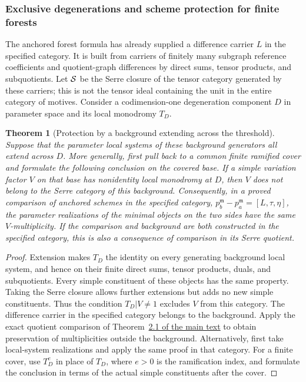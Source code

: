 \documentclass[11pt,a4paper,oneside]{article}
\theoremstyle{plain}
\newtheorem{theorem}{Theorem}[section]
\theoremstyle{definition}
\theoremstyle{remark}
\numberwithin{equation}{section}
\newcommand{\otherref}[2]{\href{#1.pdf}{#2}}
\begin{document}
\subsubsection{Exclusive degenerations and scheme protection for finite forests}
The anchored forest formula has already supplied a difference carrier $L$ in the specified category.
It is built from carriers of finitely many subgraph reference coefficients and quotient-graph differences by direct sums, tensor products, and subquotients.
Let $\mathcal S$ be the Serre closure of the tensor category generated by these carriers;
this is not the tensor ideal containing the unit in the entire category of motives.
Consider a codimension-one degeneration component $D$ in parameter space and its local monodromy $T_D$.

\begin{theorem}[Protection by a background extending across the threshold]\label{unified:thm:forestthreshold}
Suppose that the parameter local systems of these background generators all extend across $D$.
More generally, first pull back to a common finite ramified cover and formulate the following conclusion on the covered base.
If a simple variation factor $V$ on that base has nonidentity local monodromy at $D$,
then $V$ does not belong to the Serre category of this background.
Consequently, in a proved comparison of anchored schemes in the specified category,
$p_b^{\mathfrak m}-p_a^{\mathfrak m}=[L,\tau,\eta]$,
the parameter realizations of the minimal objects on the two sides have the same $V$-multiplicity.
If the comparison and background are both constructed in the specified category, this is also a consequence of comparison in its Serre quotient.
\end{theorem}
\begin{proof}
Extension makes $T_D$ the identity on every generating background local system, and hence on their finite direct sums,
tensor products, duals, and subquotients. Every simple constituent of these objects has the same property.
Taking the Serre closure allows further extensions but adds no new simple constituents.
Thus the condition $T_D|V\ne1$ excludes $V$ from this category.
The difference carrier in the specified category belongs to the background. Apply the exact quotient comparison of Theorem~\otherref{feynman_periods_long_paper_en}{2.1 of the main text}
to obtain preservation of multiplicities outside the background. Alternatively, first take local-system realizations and apply the same proof in that category.
For a finite cover, use $T_D^e$ in place of $T_D$, where $e>0$ is the ramification index,
and formulate the conclusion in terms of the actual simple constituents after the cover.
\end{proof}
\end{document}
